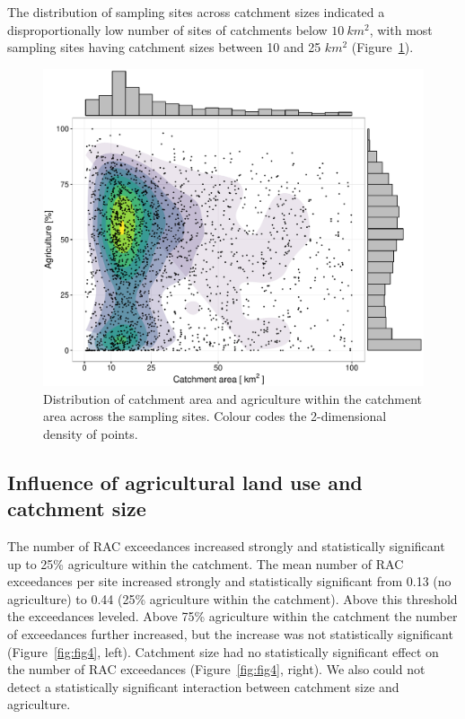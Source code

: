 \documentclass[journal=esthag,manuscript=article]{achemso}
\begin{document}
The distribution of sampling sites across catchment sizes indicated a disproportionally low number of sites of catchments below $10~km^2$, with
most sampling sites having catchment sizes between 10 and 25 $km^2$ (Figure~\ref{fig:fig3}). 


\begin{figure}[ht]
  \includegraphics[width=.8\textwidth]{figure3.pdf}
  \caption{Distribution of catchment area and agriculture within the catchment area across the sampling sites.
  Colour codes the 2-dimensional density of points.}
  \label{fig:fig3}
\end{figure}


\subsection{Influence of agricultural land use and catchment size}
The number of RAC exceedances increased strongly and statistically significant up to 25\% agriculture within the catchment.
The mean number of RAC exceedances per site increased strongly and statistically significant from 0.13 (no agriculture) to 0.44 (25\% agriculture within the catchment). 
Above this threshold the exceedances leveled.
Above 75\% agriculture within the catchment the number of exceedances further increased, but the increase was not statistically significant (Figure~\ref{fig:fig4}, left). 
Catchment size had no statistically significant effect on the number of RAC exceedances (Figure~\ref{fig:fig4}, right).
We also could not detect a statistically significant interaction between catchment size and agriculture. 
\end{document}
